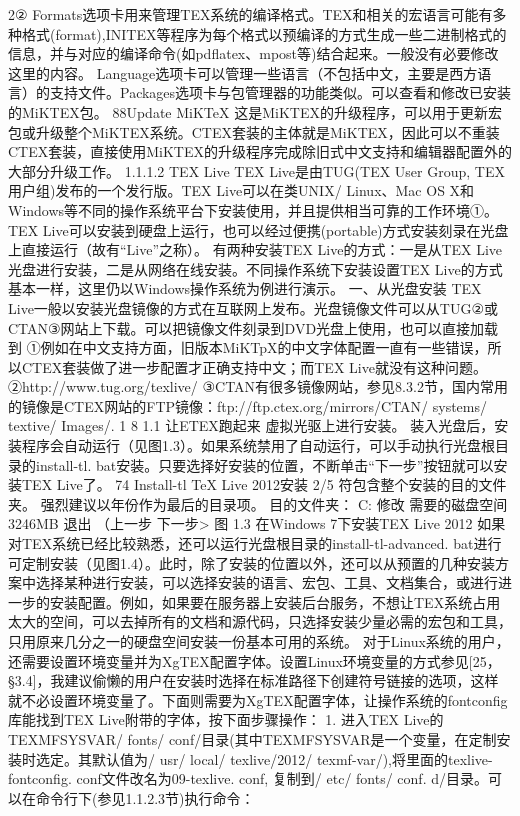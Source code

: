 \documentclass[UTF8]{ctexart}
\begin{document}
2②
Formats选项卡用来管理TEX系统的编译格式。TEX和相关的宏语言可能有多种格式(format),INITEX等程序为每个格式以预编译的方式生成一些二进制格式的信息，并与对应的编译命令(如pdflatex、mpost等)结合起来。一般没有必要修改这里的内容。
Language选项卡可以管理一些语言（不包括中文，主要是西方语言）的支持文件。Packages选项卡与包管理器的功能类似。可以查看和修改已安装的MiKTEX包。
88Update MiKTeX
这是MiKTEX的升级程序，可以用于更新宏包或升级整个MiKTEX系统。CTEX套装的主体就是MiKTEX，因此可以不重装CTEX套装，直接使用MiKTEX的升级程序完成除旧式中文支持和编辑器配置外的大部分升级工作。
1.1.1.2 TEX Live
TEX Live是由TUG(TEX User Group, TEX用户组)发布的一个发行版。TEX Live可以在类UNIX/ Linux、Mac OS X和Windows等不同的操作系统平台下安装使用，并且提供相当可靠的工作环境①。TEX Live可以安装到硬盘上运行，也可以经过便携(portable)方式安装刻录在光盘上直接运行（故有“Live”之称）。
有两种安装TEX Live的方式：一是从TEX Live光盘进行安装，二是从网络在线安装。不同操作系统下安装设置TEX Live的方式基本一样，这里仍以Windows操作系统为例进行演示。
一、从光盘安装
TEX Live一般以安装光盘镜像的方式在互联网上发布。光盘镜像文件可以从TUG②或CTAN③网站上下载。可以把镜像文件刻录到DVD光盘上使用，也可以直接加载到
①例如在中文支持方面，旧版本MiKTpX的中文字体配置一直有一些错误，所以CTEX套装做了进一步配置才正确支持中文；而TEX Live就没有这种问题。
②http://www.tug.org/texlive/
③CTAN有很多镜像网站，参见8.3.2节，国内常用的镜像是CTEX网站的FTP镜像：ftp://ftp.ctex.org/mirrors/CTAN/ systems/ textive/ Images/.
1
8	1.1 让ETEX跑起来
虚拟光驱上进行安装。
装入光盘后，安装程序会自动运行（见图1.3）。如果系统禁用了自动运行，可以手动执行光盘根目录的install-tl. bat安装。只要选择好安装的位置，不断单击“下一步”按钮就可以安装TEX Live了。
74 Install-tl
TeX Live 2012安装
2/5
符包含整个安装的目的文件夹。
强烈建议以年份作为最后的目录项。
目的文件夹：
C:\textive{}
修改
需要的磁盘空间3246MB
退出
（上一步
下一步>
图 1.3 在Windows 7下安装TEX Live 2012
如果对TEX系统已经比较熟悉，还可以运行光盘根目录的install-tl-advanced. bat进行可定制安装（见图1.4）。此时，除了安装的位置以外，还可以从预置的几种安装方案中选择某种进行安装，可以选择安装的语言、宏包、工具、文档集合，或进行进一步的安装配置。例如，如果要在服务器上安装后台服务，不想让TEX系统占用太大的空间，可以去掉所有的文档和源代码，只选择安装少量必需的宏包和工具，只用原来几分之一的硬盘空间安装一份基本可用的系统。
对于Linux系统的用户，还需要设置环境变量并为XgTEX配置字体。设置Linux环境变量的方式参见[25，§3.4]，我建议偷懒的用户在安装时选择在标准路径下创建符号链接的选项，这样就不必设置环境变量了。下面则需要为XgTEX配置字体，让操作系统的fontconfig库能找到TEX Live附带的字体，按下面步骤操作：
1. 进入TEX Live的TEXMFSYSVAR/ fonts/ conf/目录(其中TEXMFSYSVAR是一个变量，在定制安装时选定。其默认值为/ usr/ local/ texlive/2012/ texmf-var/),将里面的texlive-fontconfig. conf文件改名为09-texlive. conf, 复制到/ etc/ fonts/ conf. d/目录。可以在命令行下(参见1.1.2.3节)执行命令：
\end{document}
